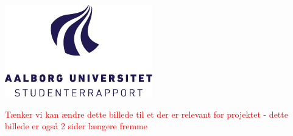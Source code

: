 \begin{center}
 






\includegraphics[height=4cm]{billeder/AAU-logo-stud-DK-RGB} %

\textcolor{red}{Tænker vi kan ændre dette billede til et der er relevant for projektet - dette billede er også 2 sider længere fremme}
 

\vfill %
\end{center}